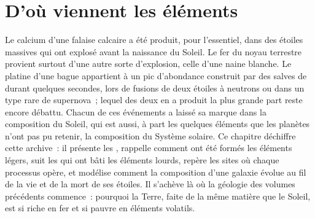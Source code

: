 \chapter{D'où viennent les éléments}\label{ch:b3:origin-of-elements}

Le calcium d'une falaise calcaire a été produit, pour l'essentiel, dans
des étoiles massives qui ont explosé avant la naissance du Soleil. Le fer du
noyau terrestre provient surtout d'une autre sorte d'explosion, celle d'une
naine blanche. Le platine d'une bague appartient à un pic d'abondance construit
par des salves de  durant quelques secondes, lors de fusions de deux
étoiles à neutrons ou dans un type rare de supernova~; lequel des deux en a produit la plus grande part
reste encore débattu.
Chacun de ces événements a laissé sa marque dans la composition du Soleil,
qui est aussi, à part les quelques éléments que les planètes n'ont pas pu
retenir, la composition du Système solaire. Ce chapitre déchiffre cette
archive~: il présente les , rappelle comment ont été formés les éléments légers,
suit les  qui ont bâti les éléments lourds, repère
les sites où chaque processus opère, et modélise comment la composition d'une
galaxie évolue au fil de la vie et de la mort de ses étoiles. Il s'achève là où la géologie des
volumes précédents commence~: pourquoi la Terre, faite de la même matière que
le Soleil, est si riche en fer et si pauvre en éléments volatils.

